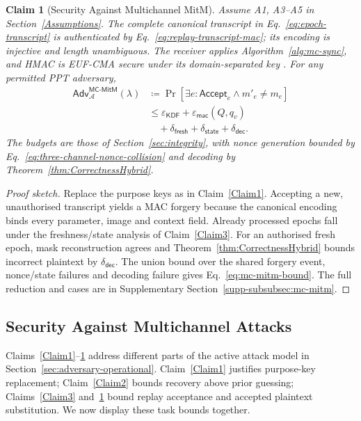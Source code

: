 \documentclass[pdflatex,sn-mathphys-num]{sn-jnl}%
\newtheorem{claim}{Claim}
\theoremstyle{definition}
\theoremstyle{game}
\theoremstyle{thmstyleone}%
\theoremstyle{thmstyletwo}%
\theoremstyle{thmstylethree}%
\begin{document}
\begin{claim}[Security Against Multichannel MitM]\label{Claim4}
Assume A1, A3--A5 in Section~\ref{Assumptions}. The complete canonical
transcript in Eq.~\eqref{eq:epoch-transcript} is authenticated by
Eq.~\eqref{eq:replay-transcript-mac}; its encoding is injective and length
unambiguous. The receiver applies Algorithm~\ref{alg:mc-sync}, and HMAC
is EUF-CMA secure under its domain-separated key
\cite{bellare1996keying,rfc2104}. For any permitted PPT adversary,
\begin{align}\label{eq:mc-mitm-bound}
\mathsf{Adv}^{\mathsf{MC\text{-}MitM}}_{\mathcal A}(\lambda)
&\coloneqq\Pr[\exists e:\mathsf{Accept}_e\wedge m'_e\ne m_e]
\nonumber\\
&\le\varepsilon_{\mathsf{KDF}}+\varepsilon_{\mathsf{mac}}(Q,q_v)
\nonumber\\
&\quad+\delta_{\mathsf{fresh}}+\delta_{\mathsf{state}}+\delta_{\mathsf{dec}}.
\end{align}
The budgets are those of Section~\ref{sec:integrity}, with nonce generation
bounded by Eq.~\eqref{eq:three-channel-nonce-collision} and decoding by
Theorem~\ref{thm:CorrectnessHybrid}.
\end{claim}

\begin{proof}[Proof sketch]
Replace the purpose keys as in Claim~\ref{Claim1}. Accepting a new,
unauthorised transcript yields a MAC forgery because the canonical encoding
binds every parameter, image and context field. Already processed epochs
fall under the freshness/state analysis of Claim~\ref{Claim3}. For an
authorised fresh epoch, mask reconstruction agrees and
Theorem~\ref{thm:CorrectnessHybrid} bounds incorrect plaintext by
$\delta_{\mathsf{dec}}$. The union bound over the shared forgery event,
nonce/state failures and decoding failure gives Eq.~\eqref{eq:mc-mitm-bound}.
The full reduction and cases are in Supplementary
Section~\ref{supp-subsubsec:mc-mitm}.
\end{proof}

\subsection{Security Against Multichannel Attacks}
\label{sec:CombinedMultichannelSecurity}
Claims~\ref{Claim1}--\ref{Claim4} address different parts of the active
attack model in Section~\ref{sec:adversary-operational}.
Claim~\ref{Claim1} justifies purpose-key replacement;
Claim~\ref{Claim2} bounds recovery above prior guessing;
Claims~\ref{Claim3} and~\ref{Claim4} bound replay acceptance and accepted
plaintext substitution. We now display these task bounds together.
\end{document}

